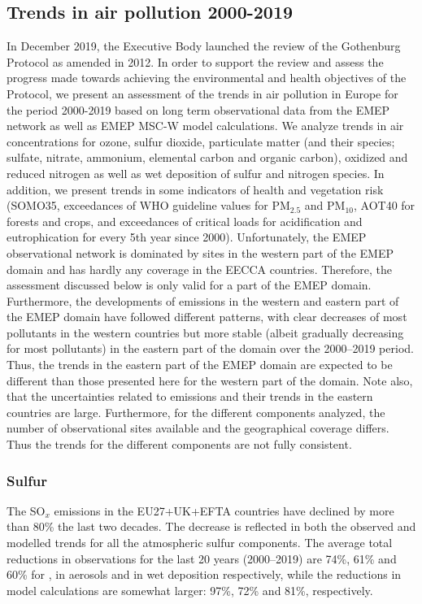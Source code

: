 \subsection*{Trends in air pollution 2000-2019}
In December 2019, the Executive Body launched the review of the Gothenburg Protocol as amended in 2012. In order to support the review and assess the progress made towards achieving the environmental and health objectives of the Protocol, we present an assessment of the trends in air pollution in Europe for the period 2000-2019 based on long term observational data from the EMEP network as well as EMEP MSC-W model calculations.
We analyze trends in air concentrations for ozone, sulfur dioxide, particulate matter (and their species; sulfate, nitrate, ammonium, elemental carbon and organic carbon), oxidized and reduced nitrogen as well as wet deposition of sulfur and nitrogen species. In addition, we present trends in some indicators of health and vegetation risk (SOMO35, exceedances of WHO guideline values for PM$_{2.5}$ and PM$_{10}$, AOT40 for forests and crops, and exceedances of critical loads for acidification and eutrophication for every 5th year since 2000).
Unfortunately, the EMEP observational network is dominated by sites in the western part of the EMEP domain and has hardly any coverage in the EECCA countries. Therefore, the assessment discussed below is only valid for a part of the EMEP domain. Furthermore, the developments of emissions in the western and eastern part of the EMEP domain have followed different patterns, with clear decreases of most pollutants in the western countries but more stable (albeit gradually decreasing for most pollutants) in the eastern part of the domain over the 2000--2019 period. Thus, the trends in the eastern part of the EMEP domain are expected to be different than those presented here for the western part of the domain. Note also, that the uncertainties related to emissions and their trends in the eastern countries are large.
Furthermore, for the different components analyzed, the number of observational sites available and the geographical coverage differs. Thus the trends for the different components are not fully consistent. 

\subsubsection*{Sulfur}
The SO$_x$ emissions in the EU27+UK+EFTA countries have declined by more than 80\% 
the last two decades. The decrease is reflected in both the observed and modelled trends for all the atmospheric sulfur components. The average total reductions in observations for the last 20 years (2000--2019) are 74\%, 61\% and 60\% for \soii, \soiv in aerosols and in wet deposition respectively, while the reductions in model calculations are somewhat larger: 97\%, 72\% and 81\%, respectively. 

